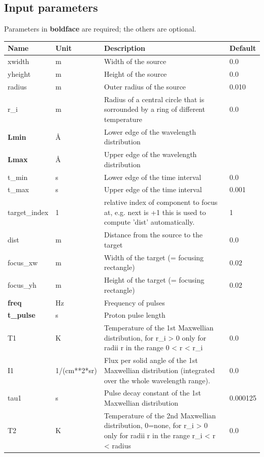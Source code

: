 \subsection*{Input parameters}
Parameters in \textbf{boldface} are required; the others are optional.

\begin{longtable}{p{}p{}p{}p{}}
\toprule
\textbf{Name} & \textbf{Unit} & \textbf{Description} & \textbf{Default} \\
\midrule
\endhead
xwidth & m & Width of the source & 0.0 \\
yheight & m & Height of the source & 0.0 \\
radius & m & Outer radius of the source & 0.010 \\
r\_i & m & Radius of a central circle that is sorrounded by a ring of different temperature & 0.0 \\
\textbf{Lmin} & \AA{} & Lower edge of the wavelength distribution &  \\
\textbf{Lmax} & \AA{} & Upper edge of the wavelength distribution &  \\
t\_min & s & Lower edge of the time interval & 0.0 \\
t\_max & s & Upper edge of the time interval & 0.001 \\
target\_index & 1 & relative index of component to focus at, e.g. next is +1 this is used to compute 'dist' automatically. & 1 \\
dist & m & Distance from the source to the target & 0.0 \\
focus\_xw & m & Width  of the target (= focusing rectangle) & 0.02 \\
focus\_yh & m & Height of the target (= focusing rectangle) & 0.02 \\
\textbf{freq} & Hz & Frequency of pulses &  \\
\textbf{t\_pulse} & s & Proton pulse length &  \\
T1 & K & Temperature of the 1st Maxwellian distribution, for r\_i \textgreater{} 0 only for radii r in the range 0 \textless{} r \textless{} r\_i & 0.0 \\
I1 & 1/(cm**2*sr) & Flux per solid angle of the 1st Maxwellian distribution (integrated over the whole wavelength range). & 0.0 \\
tau1 & s & Pulse decay constant of the 1st Maxwellian distribution & 0.000125 \\
T2 & K & Temperature of the 2nd Maxwellian distribution, 0=none, for r\_i \textgreater{} 0 only for radii r in the range r\_i \textless{} r \textless{} radius & 0.0 \\

\end{longtable}
